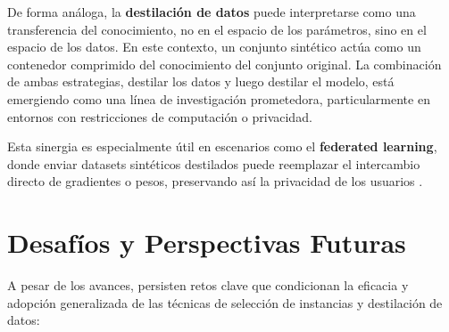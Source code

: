 De forma análoga, la \textbf{destilación de datos} puede interpretarse como una transferencia del conocimiento, no en el espacio de los parámetros, sino en el espacio de los datos.
En este contexto, un conjunto sintético actúa como un contenedor comprimido del conocimiento del conjunto original.
La combinación de ambas estrategias, destilar los datos y luego destilar el modelo,  está emergiendo como una línea de investigación prometedora, particularmente en entornos con restricciones de computación o privacidad.

Esta sinergia es especialmente útil en escenarios como el \textbf{federated learning}, donde enviar datasets sintéticos destilados puede reemplazar el intercambio directo de gradientes o pesos, preservando así la privacidad de los usuarios \cite{zhouDistilledOneShotFederated2021, arazziSecureFederatedData2025}.

\section{Desafíos y Perspectivas Futuras}
A pesar de los avances, persisten retos clave que condicionan la eficacia y adopción generalizada de las técnicas de selección de instancias y destilación de datos:

